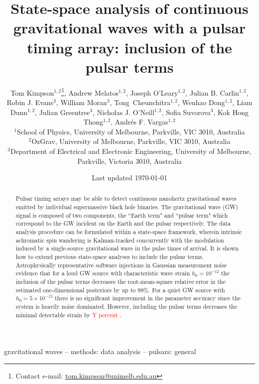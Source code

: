 \documentclass[fleqn,usenatbib,useAMS]{mnras}
\title[State-space PTA]{State-space analysis of continuous gravitational waves with a pulsar timing array: inclusion of the pulsar terms}
\author[Kimpson]{Tom Kimpson$^{1,2}$\thanks{Contact e-mail: \href{tom.kimpson@unimelb.edu.au}{tom.kimpson@unimelb.edu.au}}, Andrew Melatos$^{1,2}$, Joseph O'Leary$^{1,2}$, Julian B. Carlin$^{1,2}$, Robin J. Evans$^{3}$, \newauthor William Moran$^{3}$, Tong Cheunchitra$^{1,2}$, Wenhao Dong$^{1,2}$, Liam Dunn$^{1,2}$, Julian Greentree$^{3}$, Nicholas J. O'Neill$^{1,2}$, \newauthor Sofia Suvorova$^{3}$, Kok Hong Thong$^{1,2}$, Andrés F. Vargas$^{1,2}$%
\\
$^{1}$School of Physics, University of Melbourne, Parkville, VIC 3010, Australia \\
$^{2}$OzGrav, University of Melbourne, Parkville, VIC 3010, Australia \\
$^{3}$Department of Electrical and Electronic Engineering, University of Melbourne, Parkville, Victoria 3010, Australia }
\date{Last updated \today}
\begin{document}
\label{firstpage}
\pagerange{\pageref{firstpage}--\pageref{lastpage}}
\maketitle

\begin{abstract}	
	 Pulsar timing arrays may be able to detect continuous nanohertz gravitational waves emitted by individual supermassive black hole binaries. The gravitational wave (GW) signal is composed of two components, the ``Earth term" and ``pulsar term" which correspond to the GW incident on the Earth and the pulsar respectively. The data analysis procedure can be formulated within a state-space framework, wherein intrinsic achromatic spin wandering is Kalman-tracked concurrently with the modulation induced by a single-source gravitational wave in the pulse times of arrival. It is shown how to extend previous state-space analyses to include the pulsar terms. Astrophysically representative software injections in Gaussian measurement noise evidence that for a loud GW source with characteristic wave strain $h_0 = 10^{-12}$ the inclusion of the pulsar terms decreases the root-mean-square relative error in the estimated one-dimensional posteriors by up to 99\%. For a quiet GW source with $h_0 = 5 \times 10^{-15}$ there is no significant improvement in the parameter accuracy since the system is heavily noise dominated. However, including the pulsar terms decreases the minimal detectable strain by \textcolor{red}{Y percent} .
\end{abstract}

\begin{keywords}
gravitational waves -- methods: data analysis -- pulsars: general
\end{keywords}



\begingroup
\let\clearpage\relax
\endgroup
\newpage
\end{document}
